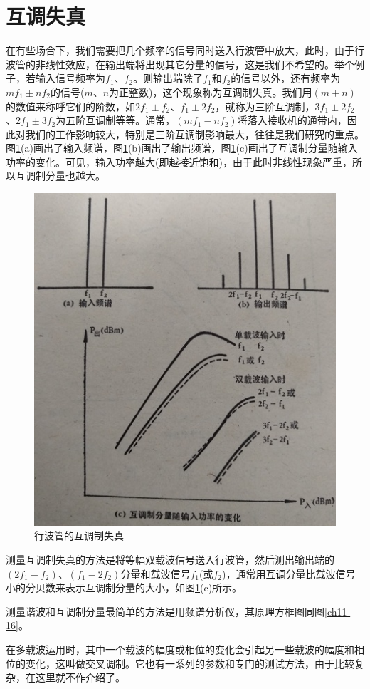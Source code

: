 \section{互调失真}
在有些场合下，我们需要把几个频率的信号同时送入行波管中放大，此时，由于行波管的非线性效应，在输出端将出现其它分量的信号，这是我们不希望的。举个例子，若输入信号频率为$ f_1 $、$ f_2 $。则输出端除了$ f_1 $和$ f_2 $的信号以外，还有频率为$ mf_1\pm nf_2 $的信号($ m $、$ n $为正整数)，这个现象称为互调制失真。我们用$ (m+n) $的数值来称呼它们的阶数，如$ 2f_1\pm f_2 $、$ f_1\pm 2f_2 $，就称为三阶互调制，$ 3f_1 \pm 2f_2 $、$ 2f_1 \pm 3f_2 $为五阶互调制等等。通常，$ (mf_1 -nf_2)$将落入接收机的通带内，因此对我们的工作影响较大，特别是三阶互调制影响最大，往往是我们研究的重点。图\ref{ch11-22}(a)画出了输入频谱，图\ref{ch11-22}(b)画出了输出频谱，图\ref{ch11-22}(c)画出了互调制分量随输入功率的变化。可见，输入功率越大(即越接近饱和)，由于此时非线性现象严重，所以互调制分量也越大。
\begin{figure}[phtb]
	\centering
	\includegraphics[width=0.6\linewidth]{figure/ch11-22}
	\caption{行波管的互调制失真}
	\label{ch11-22}
\end{figure}

测量互调制失真的方法是将等幅双载波信号送入行波管，然后测出输出端的$ (2f_1-f_2) $、$ (f_1-2f_2) $分量和载波信号$ f_1 $(或$ f_2 $)，通常用互调分量比载波信号小的分贝数来表示互调制分量的大小，如图\ref{ch11-22}(c)所示。


测量谐波和互调制分量最简单的方法是用频谱分析仪，其原理方框图同图\ref{ch11-16}。


在多载波运用时，其中一个载波的幅度或相位的变化会引起另一些载波的幅度和相位的变化，这叫做交叉调制。它也有一系列的参数和专门的测试方法，由于比较复杂，在这里就不作介绍了。

